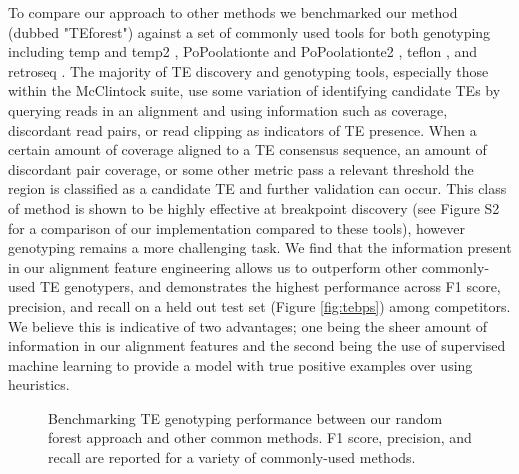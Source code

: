 To compare our approach to other methods we benchmarked our method (dubbed "TEforest") against a set of commonly used tools for both genotyping including temp and temp2 \cite{yuBenchmarkAlgorithmDetecting2021}, PoPoolationte and PoPoolationte2 \cite{koflerPoPoolation2IdentifyingDifferentiation2011}, teflon \cite{adrionGenomeWideEstimatesTransposable2017}, and retroseq \cite{keaneRetroSeqTransposableElement2013}. The majority of TE discovery and genotyping tools, especially those within the McClintock suite, use some variation of identifying candidate TEs by querying reads in an alignment and using information such as coverage, discordant read pairs, or read clipping as indicators of TE presence. When a certain amount of coverage aligned to a TE consensus sequence, an amount of discordant pair coverage, or some other metric pass a relevant threshold the region is classified as a candidate TE and further validation can occur. This class of method is shown to be highly effective at breakpoint discovery (see Figure S2 for a comparison of our implementation compared to these tools), however genotyping remains a more challenging task. We find that the information present in our alignment feature engineering allows us to outperform other commonly-used TE genotypers, and demonstrates the highest performance across F1 score, precision, and recall on a held out test set (Figure \ref{fig:tebps}) among competitors. We believe this is indicative of two advantages; one being the sheer amount of information in our alignment features and the second being the use of supervised machine learning to provide a model with true positive examples over using heuristics.

\begin{figure}
    \centering
    \caption[Benchmarking TE genotyping performance between common methods.]{Benchmarking TE genotyping performance between our random forest approach and other common methods. F1 score, precision, and recall are reported for a variety of commonly-used methods.}
    \label{fig:teperf}
\end{figure}

